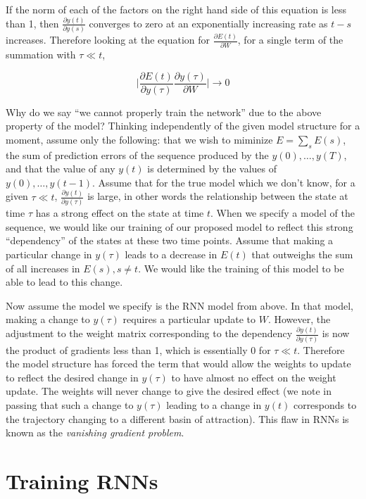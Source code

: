 If the norm of each of the factors on the right hand side of this equation is less than 1, then $\frac{\partial y(t)}{\partial y(s)}$ converges to zero at an exponentially increasing rate as $t - s$ increases. Therefore looking at the equation for $\frac{\partial E(t)}{\partial W}$, for a single term of the summation with $\tau \ll t$,

\begin{equation*}
\biggl\lvert \frac{\partial E(t)}{\partial y(\tau)} \frac{\partial y(\tau)}{\partial W} \biggr\rvert \to 0
\end{equation*}

Why do we say ``we cannot properly train the network'' due to the above property of the model? Thinking independently of the given model structure for a moment, assume only the following: that we wish to miminize $E = \sum_{s} E(s)$, the sum of prediction errors of the sequence produced by the $y(0), \ldots, y(T)$, and that the value of any $y(t)$ is determined by the values of $y(0), \ldots, y(t-1)$. Assume that for the true model which we don't know, for a given $\tau \ll t$, $\frac{\partial y(t)}{\partial y(\tau)}$ is large, in other words the relationship between the state at time $\tau$ has a strong effect on the state at time $t$. When we specify a model of the sequence, we would like our training of our proposed model to reflect this strong ``dependency'' of the states at these two time points. Assume that making a particular change in $y(\tau)$ leads to a decrease in $E(t)$ that outweighs the sum of all increases in $E(s), s \neq t$. We would like the training of this model to be able to lead to this change.

Now assume the model we specify is the RNN model from above. In that model, making a change to $y(\tau)$ requires a particular update to $W$. However, the adjustment to the weight matrix corresponding to the dependency $\frac{\partial y(t)}{\partial y(\tau)}$ is now the product of gradients less than 1, which is essentially 0 for $\tau \ll t$. Therefore the model structure has forced the term that would allow the weights to update to reflect the desired change in $y(\tau)$ to have almost no effect on the weight update. The weights will never change to give the desired effect (we note in passing that such a change to $y(\tau)$ leading to a change in $y(t)$ corresponds to the trajectory changing to a different basin of attraction). This flaw in RNNs is known as the \emph{vanishing gradient problem}.

\section{Training RNNs}

